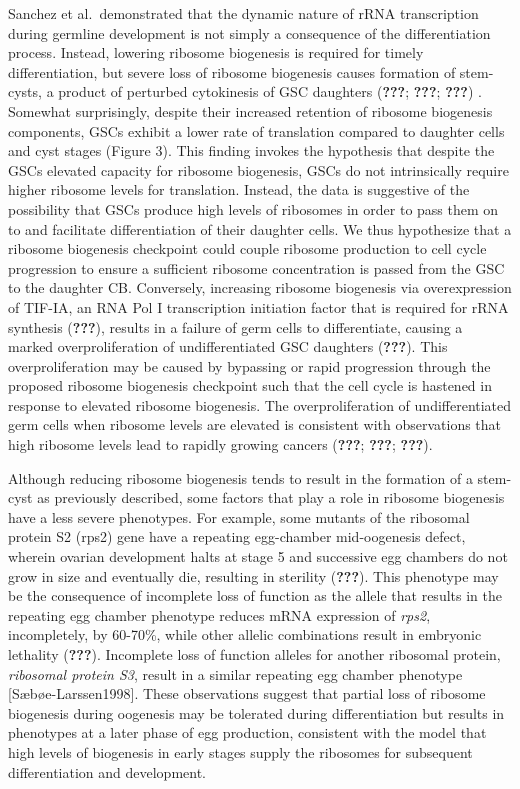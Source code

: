 \documentclass[12pt,oneside]{reedthesis}
\begin{document}
Sanchez et al.~demonstrated that the dynamic nature of rRNA
transcription during germline development is not simply a consequence of
the differentiation process. Instead, lowering ribosome biogenesis is
required for timely differentiation, but severe loss of ribosome
biogenesis causes formation of stem-cysts, a product of perturbed
cytokinesis of GSC daughters ({\textbf{???}}; {\textbf{???}}; {\textbf{???}}) . Somewhat surprisingly, despite their increased
retention of ribosome biogenesis components, GSCs exhibit a lower rate
of translation compared to daughter cells and cyst stages (Figure 3).
This finding invokes the hypothesis that despite the GSCs elevated
capacity for ribosome biogenesis, GSCs do not intrinsically require
higher ribosome levels for translation. Instead, the data is suggestive
of the possibility that GSCs produce high levels of ribosomes in order
to pass them on to and facilitate differentiation of their daughter
cells. We thus hypothesize that a ribosome biogenesis checkpoint could
couple ribosome production to cell cycle progression to ensure a
sufficient ribosome concentration is passed from the GSC to the daughter
CB. Conversely, increasing ribosome biogenesis via overexpression of
TIF-IA, an RNA Pol I transcription initiation factor that is required
for rRNA synthesis ({\textbf{???}}), results in a failure of germ cells
to differentiate, causing a marked overproliferation of undifferentiated
GSC daughters ({\textbf{???}}). This overproliferation may be caused by
bypassing or rapid progression through the proposed ribosome biogenesis
checkpoint such that the cell cycle is hastened in response to elevated
ribosome biogenesis. The overproliferation of undifferentiated germ
cells when ribosome levels are elevated is consistent with observations
that high ribosome levels lead to rapidly growing cancers
({\textbf{???}}; {\textbf{???}}; {\textbf{???}}).

Although reducing ribosome biogenesis tends to result in the formation
of a stem-cyst as previously described, some factors that play a role in
ribosome biogenesis have a less severe phenotypes. For example, some
mutants of the ribosomal protein S2 (rps2) gene have a repeating
egg-chamber mid-oogenesis defect, wherein ovarian development halts at
stage 5 and successive egg chambers do not grow in size and eventually
die, resulting in sterility ({\textbf{???}}). This phenotype may be
the consequence of incomplete loss of function as the allele that
results in the repeating egg chamber phenotype reduces mRNA expression
of \emph{rps2}, incompletely, by 60-70\%, while other allelic combinations
result in embryonic lethality ({\textbf{???}}). Incomplete loss of
function alleles for another ribosomal protein, \emph{ribosomal protein S3},
result in a similar repeating egg chamber phenotype
{[}Sæbøe-Larssen1998{]}. These observations suggest that partial loss of
ribosome biogenesis during oogenesis may be tolerated during
differentiation but results in phenotypes at a later phase of egg
production, consistent with the model that high levels of biogenesis in
early stages supply the ribosomes for subsequent differentiation and
development.
\end{document}
